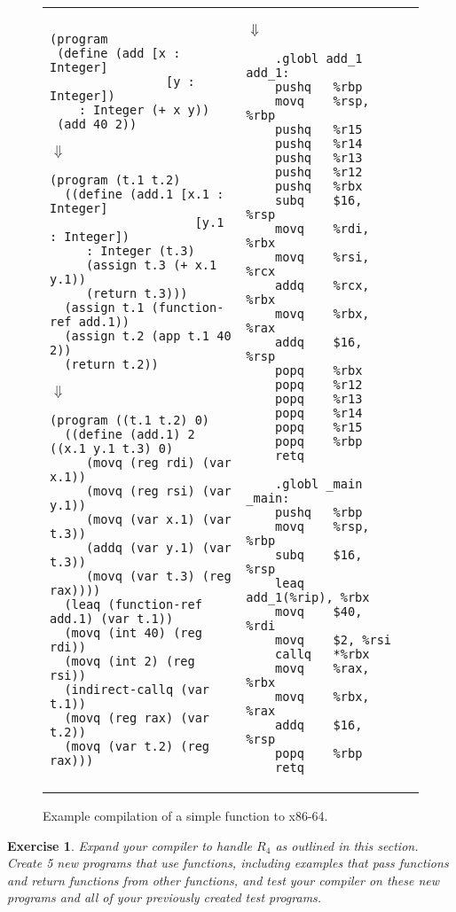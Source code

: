 \documentclass[11pt]{book}
\newtheorem{exercise}[theorem]{Exercise}
\begin{document}
\begin{figure}[tbp]
\begin{tabular}{lll}
\begin{minipage}{0.5\textwidth}
\begin{lstlisting}
(program
 (define (add [x : Integer] 
                [y : Integer]) 
    : Integer (+ x y))
 (add 40 2))
\end{lstlisting}
$\Downarrow$
\begin{lstlisting}
(program (t.1 t.2)
  ((define (add.1 [x.1 : Integer] 
                    [y.1 : Integer])
     : Integer (t.3)
     (assign t.3 (+ x.1 y.1))
     (return t.3)))
  (assign t.1 (function-ref add.1))
  (assign t.2 (app t.1 40 2))
  (return t.2))
\end{lstlisting}
$\Downarrow$
\begin{lstlisting}
(program ((t.1 t.2) 0)
  ((define (add.1) 2 ((x.1 y.1 t.3) 0)
     (movq (reg rdi) (var x.1))
     (movq (reg rsi) (var y.1))
     (movq (var x.1) (var t.3))
     (addq (var y.1) (var t.3))
     (movq (var t.3) (reg rax))))
  (leaq (function-ref add.1) (var t.1))
  (movq (int 40) (reg rdi))
  (movq (int 2) (reg rsi))
  (indirect-callq (var t.1))
  (movq (reg rax) (var t.2))
  (movq (var t.2) (reg rax)))
\end{lstlisting}
\end{minipage}
&
\begin{minipage}{0.4\textwidth}
$\Downarrow$
\begin{lstlisting}
	.globl add_1
add_1:
	pushq	%rbp
	movq	%rsp, %rbp
	pushq	%r15
	pushq	%r14
	pushq	%r13
	pushq	%r12
	pushq	%rbx
	subq	$16, %rsp
	movq	%rdi, %rbx
	movq	%rsi, %rcx
	addq	%rcx, %rbx
	movq	%rbx, %rax
	addq	$16, %rsp
	popq	%rbx
	popq	%r12
	popq	%r13
	popq	%r14
	popq	%r15
	popq	%rbp
	retq

	.globl _main
_main:
	pushq	%rbp
	movq	%rsp, %rbp
	subq	$16, %rsp
	leaq	add_1(%rip), %rbx
	movq	$40, %rdi
	movq	$2, %rsi
	callq	*%rbx
	movq	%rax, %rbx
	movq	%rbx, %rax
	addq	$16, %rsp
	popq	%rbp
	retq
\end{lstlisting}
\end{minipage}
\end{tabular} 
\caption{Example compilation of a simple function to x86-64.}
\label{fig:add-fun}
\end{figure}



\begin{exercise}\normalfont
Expand your compiler to handle $R_4$ as outlined in this section.
Create 5 new programs that use functions, including examples that pass
functions and return functions from other functions, and test your
compiler on these new programs and all of your previously created test
programs.
\end{exercise}
\end{document}
